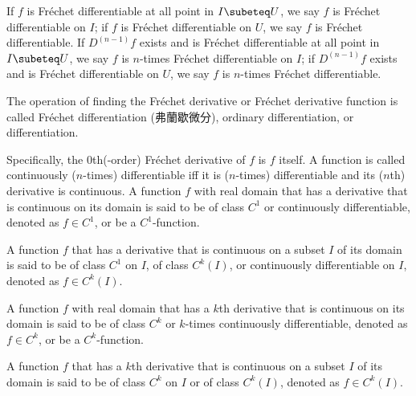 \documentclass[a4paper,12pt]{report}
\begin{document}
\begin{itemize}
\begin{itemize}
If $f$ is Fréchet differentiable at all point in $I\subeteq U$, we say $f$ is Fréchet differentiable on $I$; if $f$ is Fréchet differentiable on $U$, we say $f$ is Fréchet differentiable. If $D^{(n-1)}f$ exists and is Fréchet differentiable at all point in $I\subeteq U$, we say $f$ is $n$-times Fréchet differentiable on $I$; if $D^{(n-1)}f$ exists and is Fréchet differentiable on $U$, we say $f$ is $n$-times Fréchet differentiable.

The operation of finding the Fréchet derivative or Fréchet derivative function is called Fréchet differentiation (弗蘭歇微分), ordinary differentiation, or differentiation.

Specifically, the $0$th(-order) Fréchet derivative of $f$ is $f$ itself.
A function is called continuously ($n$-times) differentiable iff it is ($n$-times) differentiable and its ($n$th) derivative is continuous.
A function $f$ with real domain that has a derivative that is continuous on its domain is said to be of class $C^1$ or continuously differentiable, denoted as $f\in C^1$, or be a $C^1$-function.

A function $f$ that has a derivative that is continuous on a subset $I$ of its domain is said to be of class $C^1$ on $I$, of class $C^k(I)$, or continuously differentiable on $I$, denoted as $f\in C^k(I)$.

A function $f$ with real domain that has a $k$th derivative that is continuous on its domain is said to be of class $C^k$ or $k$-times continuously differentiable, denoted as $f\in C^k$, or be a $C^k$-function.

A function $f$ that has a $k$th derivative that is continuous on a subset $I$ of its domain is said to be of class $C^k$ on $I$ or of class $C^k(I)$, denoted as $f\in C^k(I)$.


\end{itemize}
\end{itemize}
\end{document}
